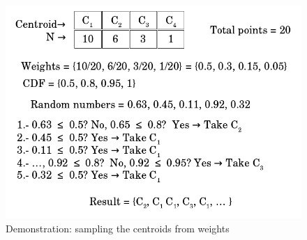 \begin{figure}[h!]
 \centering
 \includegraphics[scale=0.4]{./styles/sampling.png}
 \caption{Demonstration: sampling the centroids from weights}
 \label{fig:sampling}
\end{figure}


